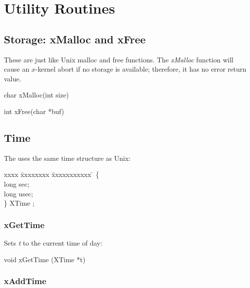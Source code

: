 % 
%
%
%
%
%


\section{Utility Routines}

\subsection{Storage: xMalloc and xFree}

These are just like Unix malloc and free functions.  The {\em xMalloc}
function will cause an $x$-kernel abort if no storage is available;
therefore, it has no error return value.
\medskip

{\sem char} {\bold *xMalloc}({\sem int} {\caps size})\\
\medskip

{\sem int} {\bold xFree}({\sem char} *{\caps buf})

\subsection{Time}

The \xk{} uses the same time structure as Unix:

\begin{tabbing}
xxxx \= xxxxxxxx \= xxxxxxxxxxx \= \kill
{} \{\\
\>\>  {\sem long}  sec;\\
\>\>  {\sem long}  usec;\\
\>\} {\bold XTime} ;\\
\end{tabbing}


\subsubsection{xGetTime}

Sets {\em *t} to the current time of day:
\medskip

{\sem void} {\bold xGetTime} ({\sem XTime} *{\caps t})


\subsubsection{xAddTime}

